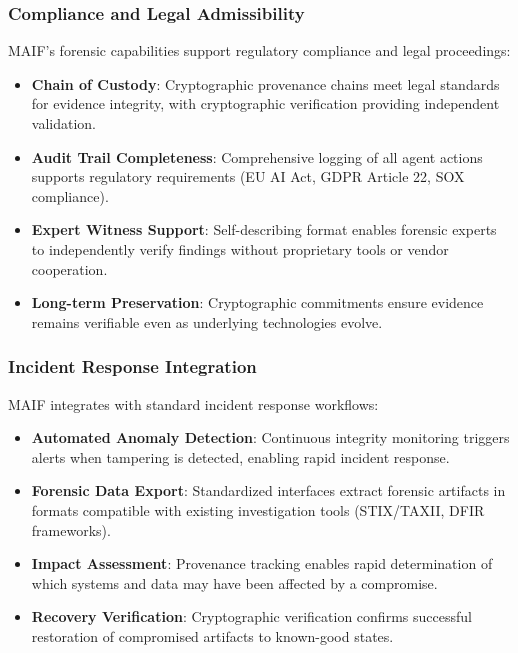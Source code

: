 \documentclass[conference]{IEEEtran}
\begin{document}
\subsubsection{Compliance and Legal Admissibility}

MAIF's forensic capabilities support regulatory compliance and legal proceedings:

\begin{itemize}[leftmargin=*]
\item \textbf{Chain of Custody}: Cryptographic provenance chains meet legal standards for evidence integrity, with cryptographic verification providing independent validation.
\item \textbf{Audit Trail Completeness}: Comprehensive logging of all agent actions supports regulatory requirements (EU AI Act, GDPR Article 22, SOX compliance).
\item \textbf{Expert Witness Support}: Self-describing format enables forensic experts to independently verify findings without proprietary tools or vendor cooperation.
\item \textbf{Long-term Preservation}: Cryptographic commitments ensure evidence remains verifiable even as underlying technologies evolve.
\end{itemize}

\subsubsection{Incident Response Integration}

MAIF integrates with standard incident response workflows:

\begin{itemize}[leftmargin=*]
\item \textbf{Automated Anomaly Detection}: Continuous integrity monitoring triggers alerts when tampering is detected, enabling rapid incident response.
\item \textbf{Forensic Data Export}: Standardized interfaces extract forensic artifacts in formats compatible with existing investigation tools (STIX/TAXII, DFIR frameworks).
\item \textbf{Impact Assessment}: Provenance tracking enables rapid determination of which systems and data may have been affected by a compromise.
\item \textbf{Recovery Verification}: Cryptographic verification confirms successful restoration of compromised artifacts to known-good states.
\end{itemize}
\end{document}
